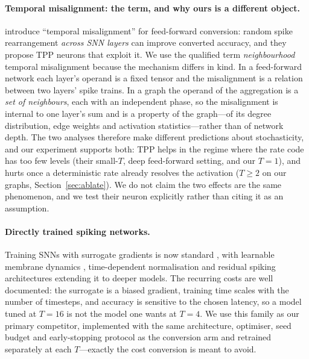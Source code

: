 \documentclass[10pt,twocolumn]{article}
\newcommand{\secref}[1]{Section~\ref{#1}}
\begin{document}
\paragraph{Temporal misalignment: the term, and why ours is a different object.}
\citet{bojkovic2025temporal} introduce ``temporal misalignment'' for feed-forward conversion:
random spike rearrangement \emph{across SNN layers} can improve converted accuracy, and they propose
TPP neurons that exploit it. We use the qualified term \emph{neighbourhood} temporal misalignment
because the mechanism differs in kind. In a feed-forward network each layer's operand is a fixed
tensor and the misalignment is a relation between two layers' spike trains. In a graph the operand
of the aggregation is a \emph{set of neighbours}, each with an independent phase, so the misalignment
is internal to one layer's sum and is a property of the graph---of its degree distribution, edge
weights and activation statistics---rather than of network depth. The two analyses therefore make
different predictions about stochasticity, and our experiment supports both: TPP helps in the regime
where the rate code has too few levels (their small-$T$, deep feed-forward setting, and our $T=1$),
and hurts once a deterministic rate already resolves the activation ($T \ge 2$ on our graphs,
\secref{sec:ablate}). We do not claim the two effects are the same phenomenon, and we test their
neuron explicitly rather than citing it as an assumption.

\paragraph{Directly trained spiking networks.}
Training SNNs with surrogate gradients is now standard \citep{neftci2019surrogate}, with learnable
membrane dynamics \citep{fang2021incorporating}, time-dependent normalisation
\citep{zheng2021going} and residual spiking architectures \citep{fang2021deep} extending it to
deeper models. The recurring costs are well documented: the surrogate is a biased gradient, training
time scales with the number of timesteps, and accuracy is sensitive to the chosen latency, so a model
tuned at $T=16$ is not the model one wants at $T=4$. We use this family as our primary competitor,
implemented with the same architecture, optimiser, seed budget and early-stopping protocol as the
conversion arm and retrained separately at each $T$---exactly the cost conversion is meant to avoid.
\end{document}
